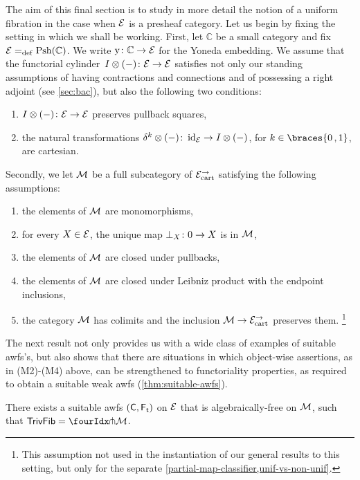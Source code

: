 \documentclass[reqno,10pt,a4paper,oneside,draft]{amsart}
\begin{document}
{{The aim of this final section is to study in more detail the notion of a uniform fibration in the case when $\cal{E}$ is a presheaf category.
Let us begin by fixing the setting in which we shall be working.
First, let $\mathbb{C}$ be a small category and fix $\cal{E} \defeq \Psh(\mathbb{C})$.
We write $\yon \co \mathbb{C} \to \cal{E}$ for the Yoneda embedding.
We assume that the functorial cylinder~$\interval \otimes (-) \co \cal{E} \to \cal{E}$ satisfies not only our standing assumptions of having contractions and connections and of possessing a right adjoint (see \cref{sec:bac}), but also the following two conditions:
\begin{enumerate}[({C}1)]
\item $\interval \otimes (-) \co \cal{E} \to \cal{E}$ preserves pullback squares,
\item the natural transformations $\kcyl \otimes (-) \co \id_\cal{E} \to \interval \otimes (-)$, for $k \in \braces{0\,, 1}$, are cartesian.
\end{enumerate}
Secondly, we let $\cal{M}$ be a full subcategory of $\cal{E}^\to_\cart$ satisfying the following assumptions:
\begin{enumerate}[({M}1)]
\item the elements of $\cal{M}$ are monomorphisms,
\item for every $X \in \cal{E}$, the unique map $\bot_X \co 0 \to X$ is in $\cal{M}$,
\item the elements of $\cal{M}$ are closed under pullbacks,
\item the elements of $\cal{M}$ are closed under Leibniz product with the endpoint inclusions,
\item the category $\cal{M}$ has colimits and the inclusion $\cal{M} \to \cal{E}^\to_\mathrm{cart}$ preserves them.%
\footnote{This assumption not used in the instantiation of our general results to this setting, but only for the separate \cref{partial-map-classifier,unif-vs-non-unif}.}
\end{enumerate}
The next result not only provides us with a wide class of examples of suitable awfs's, but also shows that there are situations in which object-wise assertions, as in (M2)-(M4) above, can be strengthened to functoriality properties, as required to obtain a suitable weak awfs (\cref{thm:suitable-awfs}).

\begin{theorem} \label{rem-lift-suitable}
There exists a suitable awfs $(\CC, \TF)$ on $\cal{E}$ that is algebraically-free on $\cal{M}$, \ie such that $\TrivFib = \liftr{\cal{M}}$.
\end{theorem}

}}
\end{document}
